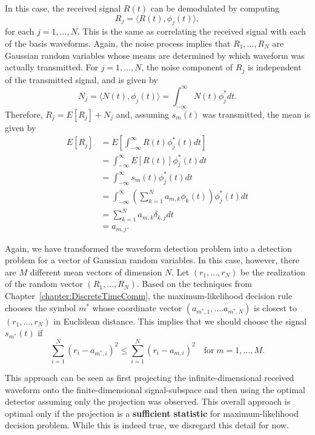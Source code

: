 In this case, the received signal $R(t)$ can be demodulated by computing
\[ R_j = \langle R(t), \phi_j (t) \rangle, \]
for each $j=1,\ldots,N$.
This is the same as correlating the received signal with each of the basis waveforms.
Again, the noise process implies that $R_1 , \ldots, R_N$ are Gaussian random variables whose means are determined by which waveform was actually transmitted.
For $j=1,\ldots,N$, the noise component of $R_j$ is independent of the transmitted signal, and is given by
\[ N_j = \langle N(t), \phi_j (t) \rangle = \int_{-\infty}^{\infty} N(t) \phi_j^* dt. \]
Therefore, $R_j = E[R_j] + N_j$ and, assuming $s_m (t)$ was transmitted, the mean is given by
\begin{align*}
E \left[R_j \right]
&= E \left[ \int_{-\infty}^{\infty} R(t) \phi_j^* (t) dt \right] \\
&= \int_{-\infty}^{\infty} E \left[ R(t) \right] \phi_j^* (t) dt \\
&= \int_{-\infty}^{\infty} s_m (t) \phi_j^* (t) dt \\
&= \int_{-\infty}^{\infty} \left( \sum_{k=1}^N a_{m,k} \phi_k (t) \right) \phi_j^* (t) dt \\
&= \sum_{k=1}^N a_{m,k} \delta_{k,j} dt \\
&= a_{m,j}. 
\end{align*}

Again, we have transformed the waveform detection problem into a detection problem for a vector of Gaussian random variables.
In this case, however, there are $M$ different mean vectors of dimension $N$.
Let $(r_1, \ldots, r_N)$ be the realization of the random vector $(R_1,\ldots,R_N)$.
Based on the techniques from Chapter~\ref{chapter:DiscreteTimeComm}, the maximum-likelihood decision rule chooses the symbol $m^*$ whose coordinate vector $(a_{m^*,1},\ldots. a_{m^*,N})$ is closest to $(r_1,\ldots,r_N )$ in Euclidean distance.
This implies that we should choose the signal $s_{m^*}(t)$ if
\[ \sum_{i=1}^N (r_i - a_{m^*,i})^2 \leq \sum_{i=1}^N (r_i - a_{m,i})^2 \quad \mathrm{for}\; m=1,\ldots,M. \]

This approach can be seen as first projecting the infinite-dimensional received waveform onto the finite-dimensional signal-subspace and then using the optimal detector assuming only the projection was observed.
This overall approach is optimal only if the projection is a \textbf{sufficient statistic} for maximum-likelihood decision problem.
While this is indeed true, we disregard this detail for now.

